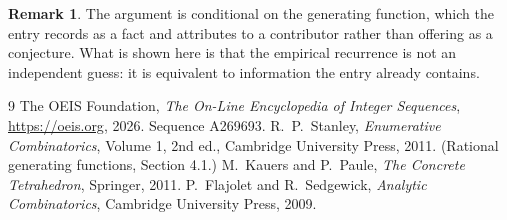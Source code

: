 \documentclass[11pt,a4paper]{article}
\theoremstyle{plain}
\theoremstyle{definition}
\newtheorem{remark}[theorem]{Remark}
\begin{document}
\begin{remark}
The argument is conditional on the generating function, which the entry records as a fact and
attributes to a contributor rather than offering as a conjecture. What is shown here is that
the empirical recurrence is not an independent guess: it is equivalent to information the
entry already contains.
\end{remark}

\begin{thebibliography}{9}
 The OEIS Foundation, \emph{The On-Line Encyclopedia of Integer
Sequences}, \url{https://oeis.org}, 2026. Sequence A269693.
 R.~P.~Stanley, \emph{Enumerative Combinatorics}, Volume 1, 2nd ed.,
Cambridge University Press, 2011. (Rational generating functions, Section 4.1.)
 M.~Kauers and P.~Paule, \emph{The Concrete Tetrahedron}, Springer, 2011.
 P.~Flajolet and R.~Sedgewick, \emph{Analytic Combinatorics}, Cambridge
University Press, 2009.
\end{thebibliography}
\end{document}
